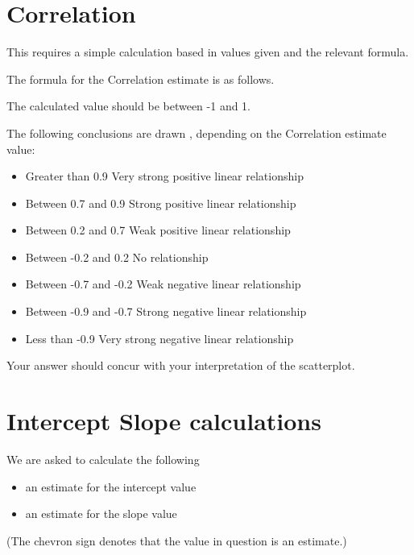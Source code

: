 \documentclass{beamer}
\begin{document}
\section{Correlation}
\begin{frame}
This requires a simple calculation based in values given and the relevant formula.

The formula for the Correlation estimate is as follows.
\end{frame}
\begin{frame}
The calculated value should be between -1 and 1.

The following conclusions are drawn , depending on the Correlation estimate value:
\begin{itemize}
\item Greater than 0.9 		Very strong positive linear relationship 
\item Between 0.7 and 0.9		Strong positive linear relationship 
\item Between 0.2 and 0.7	 	Weak positive linear relationship
\item Between -0.2 and 0.2		No relationship
\item Between -0.7 and -0.2		Weak negative linear relationship
\item Between -0.9 and -0.7		Strong negative linear relationship
\item Less than -0.9			Very strong negative linear relationship
\end{itemize}
Your answer should concur with your interpretation of the scatterplot.
\end{frame}
\section{Intercept Slope calculations}
\begin{frame}
We are asked to calculate the following
\begin{itemize} 
\item an estimate for the intercept value
\item an estimate for the slope value
\end{itemize}
(The chevron sign denotes that the value in question is an estimate.)
\end{frame}
\end{document}
